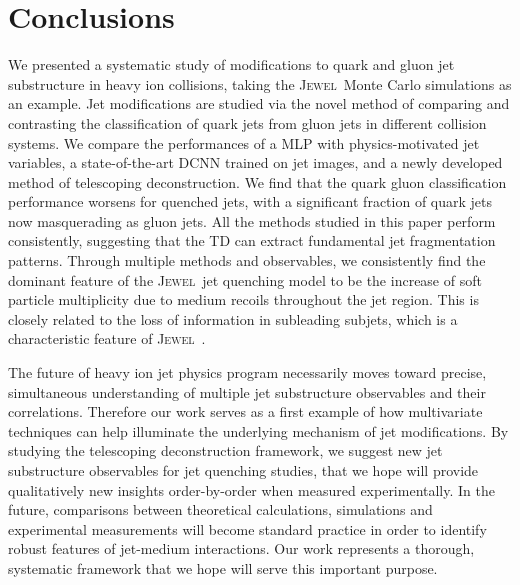 \documentclass[notoc,preprintnumbers]{JHEP3}
\newcommand{\jw}{\textsc{Jewel}~}
\begin{document}
\section{Conclusions}
\label{sec:conc}

We presented a systematic study of modifications to quark and gluon jet substructure in heavy ion collisions, taking the \jw Monte Carlo simulations as an example. Jet modifications are studied via the novel method of comparing and contrasting the classification of quark jets from gluon jets in different collision systems. We compare the performances of a MLP with physics-motivated jet variables, a state-of-the-art DCNN trained on jet images, and a newly developed method of telescoping deconstruction. We find that the quark gluon classification performance worsens for quenched jets, with a significant fraction of quark jets now masquerading as gluon jets. All the methods studied in this paper perform consistently, suggesting that the TD can extract fundamental jet fragmentation patterns. Through multiple methods and observables, we consistently find the dominant feature of the \jw jet quenching model to be the increase of soft particle multiplicity due to medium recoils throughout the jet region. This is closely related to the loss of information in subleading subjets, which is a characteristic feature of \jw.

The future of heavy ion jet physics program necessarily moves toward precise, simultaneous understanding of multiple jet substructure observables and their correlations. Therefore our work serves as a first example of how multivariate techniques can help illuminate the underlying mechanism of jet modifications. By studying the telescoping deconstruction framework, we suggest new jet substructure observables for jet quenching studies, that we hope will provide qualitatively new insights order-by-order when measured experimentally. In the future, comparisons between theoretical calculations, simulations and experimental measurements will become standard practice in order to identify robust features of jet-medium interactions. Our work represents a thorough, systematic framework that we hope will serve this important purpose.
\end{document}
